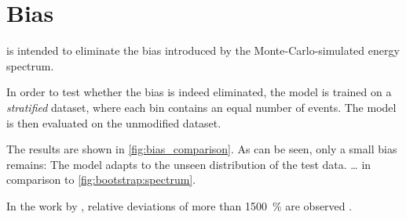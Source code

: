 \section{Bias}
\dsea is intended to eliminate the bias introduced by the Monte-Carlo-simulated energy spectrum.

In order to test
whether the bias is indeed eliminated,
the model is trained on a \emph{stratified} dataset,
where each bin contains an equal number of events.
The model is then evaluated on the unmodified dataset.

The results are shown in \autoref{fig:bias_comparison}.
As can be seen,
only a small bias remains:
The model adapts to the unseen distribution of the test data.
… in comparison to \autoref{fig:bootstrap:spectrum}.

In the work by \citeauthor{dsea_samuel},
relative deviations of more than \SI{1500}{\percent} are observed \cite{dsea_samuel}.



